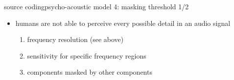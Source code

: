 	\begin{frame}{source coding}{psycho-acoustic model 4: masking threshold 1/2}
        \begin{itemize}
            \item   humans are not able to perceive every possible detail in an audio signal
                \begin{enumerate}
                    \item<1->   frequency resolution (see above)
                    \item<1->   sensitivity for specific frequency regions
                    \item<2->   components masked by other components
\end{enumerate}
\end{itemize}
\end{frame}
